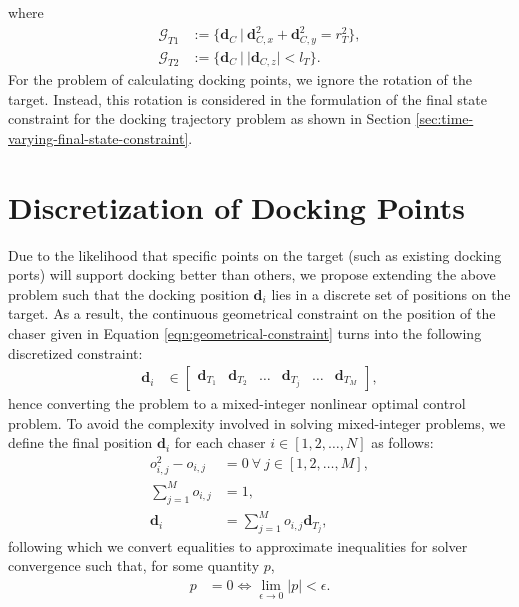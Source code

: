 where
\begin{subequations}
\begin{align}
    {\mathcal{G}}_{T1}&:=\{\boldsymbol{d}_C\ |\ \boldsymbol{d}_{C,x}^2+\boldsymbol{d}_{C,y}^2=r_T^2\},\\
    {\mathcal{G}}_{T2}&:=\{\boldsymbol{d}_C\ |\ |\boldsymbol{d}_{C,z}|<l_T\}.
\end{align}
\end{subequations}
For the problem of calculating docking points, we ignore the rotation of the target. Instead, this rotation is considered in the formulation of the final state constraint for the docking trajectory problem as shown in Section \ref{sec:time-varying-final-state-constraint}.
\section{Discretization of Docking Points}
Due to the likelihood that specific points on the target (such as existing docking ports) will support docking better than others, we propose extending the above problem such that the docking position $\boldsymbol{d}_{i}$ lies in a discrete set of positions on the target.
As a result, the continuous geometrical constraint on the position of the chaser given in Equation \ref{eqn:geometrical-constraint} turns into the following discretized constraint:
\begin{align}
    \boldsymbol{d}_{i}&\in\begin{bmatrix}
        \boldsymbol{d}_{T_1}&\boldsymbol{d}_{T_2}&\ldots&\boldsymbol{d}_{T_j}&\ldots&\boldsymbol{d}_{T_M}
    \end{bmatrix},
\end{align}
hence converting the problem to a mixed-integer nonlinear optimal control problem.
To avoid the complexity involved in solving mixed-integer problems, we define the final position $\boldsymbol{d}_{i}$ for each chaser $i\in[1,2,\ldots,N]$ as follows:
\begin{align}
    o_{i,j}^2-o_{i,j}&=0\ \forall\ j\in[1, 2, \ldots, M],\\
    \sum_{j=1}^Mo_{i,j}&=1,\\
    \boldsymbol{d}_{i}&=\sum_{j=1}^Mo_{i,j}\boldsymbol{d}_{T_j},
\end{align}
following which we convert equalities to approximate inequalities for solver convergence such that, for some quantity $p$,
\begin{align}
    p&=0\iff\lim_{\epsilon\rightarrow0}|p|<\epsilon.
\end{align}

